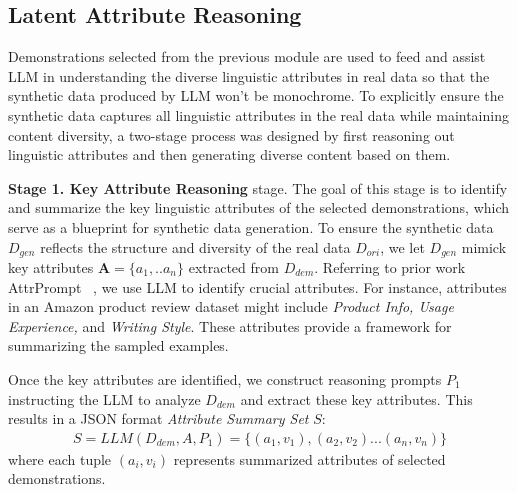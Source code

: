 

\subsection{Latent Attribute Reasoning}
Demonstrations selected from the previous module are used to feed and assist LLM in understanding the diverse linguistic attributes in real data so that the synthetic data produced by LLM won't be monochrome. To explicitly ensure the synthetic data captures all linguistic attributes in the real data while maintaining content diversity, a two-stage process was designed by first reasoning out linguistic attributes and then generating diverse content based on them. 

\textbf{Stage 1. Key Attribute Reasoning} stage. The goal of this stage is to identify and summarize the key linguistic attributes of the selected demonstrations, which serve as a blueprint for synthetic data generation. To ensure the synthetic data $D_{gen}$ reflects the structure and diversity of the real data $D_{ori}$, we let $D_{gen}$ mimick key attributes $\textbf{A} = \{a_1,..a_n\}$ extracted from $D_{dem}$. Referring to prior work AttrPrompt ~\cite{attriprompt}, we use LLM to identify crucial attributes. For instance, attributes in an Amazon product review dataset might include \textit{Product Info, Usage Experience,} and \textit{Writing Style}. These attributes provide a framework for summarizing the sampled examples.

Once the key attributes are identified, we construct reasoning prompts $P_1$ instructing the LLM to analyze $D_{dem}$ and extract these key attributes. This results in a JSON format \textit{Attribute Summary Set} $S$:
\begin{align}
S = LLM(D_{dem}, A, P_1) =\{(a_1,v_1), (a_2,v_2)... (a_n,v_n)\}
\end{align} 
where each tuple $(a_i,v_i)$ represents summarized attributes of selected demonstrations.

